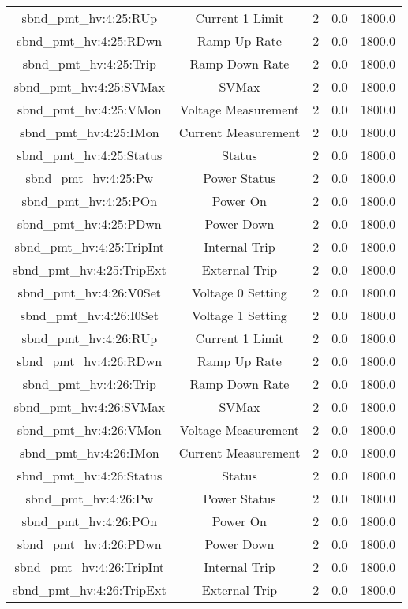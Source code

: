 \begin{center}
\begin{longtable}{c | c c c c }
sbnd\_pmt\_hv:4:25:RUp & Current 1 Limit & 2 & 0.0 & 1800.0\\ 
sbnd\_pmt\_hv:4:25:RDwn & Ramp Up Rate & 2 & 0.0 & 1800.0\\ 
sbnd\_pmt\_hv:4:25:Trip & Ramp Down Rate & 2 & 0.0 & 1800.0\\ 
sbnd\_pmt\_hv:4:25:SVMax & SVMax & 2 & 0.0 & 1800.0\\ 
sbnd\_pmt\_hv:4:25:VMon & Voltage Measurement & 2 & 0.0 & 1800.0\\ 
sbnd\_pmt\_hv:4:25:IMon & Current Measurement & 2 & 0.0 & 1800.0\\ 
sbnd\_pmt\_hv:4:25:Status & Status & 2 & 0.0 & 1800.0\\ 
sbnd\_pmt\_hv:4:25:Pw & Power Status & 2 & 0.0 & 1800.0\\ 
sbnd\_pmt\_hv:4:25:POn & Power On & 2 & 0.0 & 1800.0\\ 
sbnd\_pmt\_hv:4:25:PDwn & Power Down & 2 & 0.0 & 1800.0\\ 
sbnd\_pmt\_hv:4:25:TripInt & Internal Trip & 2 & 0.0 & 1800.0\\ 
sbnd\_pmt\_hv:4:25:TripExt & External Trip & 2 & 0.0 & 1800.0\\ 
sbnd\_pmt\_hv:4:26:V0Set & Voltage 0 Setting & 2 & 0.0 & 1800.0\\ 
sbnd\_pmt\_hv:4:26:I0Set & Voltage 1 Setting & 2 & 0.0 & 1800.0\\ 
sbnd\_pmt\_hv:4:26:RUp & Current 1 Limit & 2 & 0.0 & 1800.0\\ 
sbnd\_pmt\_hv:4:26:RDwn & Ramp Up Rate & 2 & 0.0 & 1800.0\\ 
sbnd\_pmt\_hv:4:26:Trip & Ramp Down Rate & 2 & 0.0 & 1800.0\\ 
sbnd\_pmt\_hv:4:26:SVMax & SVMax & 2 & 0.0 & 1800.0\\ 
sbnd\_pmt\_hv:4:26:VMon & Voltage Measurement & 2 & 0.0 & 1800.0\\ 
sbnd\_pmt\_hv:4:26:IMon & Current Measurement & 2 & 0.0 & 1800.0\\ 
sbnd\_pmt\_hv:4:26:Status & Status & 2 & 0.0 & 1800.0\\ 
sbnd\_pmt\_hv:4:26:Pw & Power Status & 2 & 0.0 & 1800.0\\ 
sbnd\_pmt\_hv:4:26:POn & Power On & 2 & 0.0 & 1800.0\\ 
sbnd\_pmt\_hv:4:26:PDwn & Power Down & 2 & 0.0 & 1800.0\\ 
sbnd\_pmt\_hv:4:26:TripInt & Internal Trip & 2 & 0.0 & 1800.0\\ 
sbnd\_pmt\_hv:4:26:TripExt & External Trip & 2 & 0.0 & 1800.0\\ 

\end{longtable}
\end{center}
